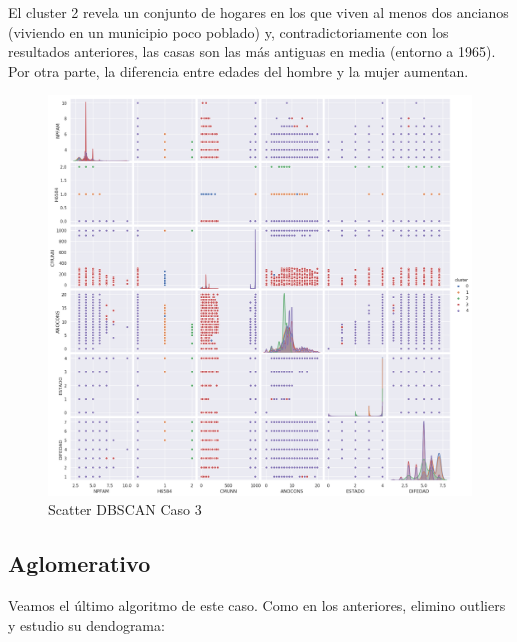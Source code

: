 El cluster 2 revela un conjunto de hogares en los que viven al menos dos ancianos (viviendo en un municipio poco poblado) y, contradictoriamente con los resultados anteriores, las casas son las más antiguas en media (entorno a 1965). Por otra parte, la diferencia entre edades del hombre y la mujer aumentan. 

\begin{figure}[H] %
	\centering
	\includegraphics[scale=0.4]{dbscan3.png}  %
	\caption{Scatter DBSCAN Caso 3} 
	\label{fig:sc-db-caso3}
\end{figure}

\subsection{Aglomerativo}

Veamos el último algoritmo de este caso. Como en los anteriores, elimino outliers y estudio su dendograma:

